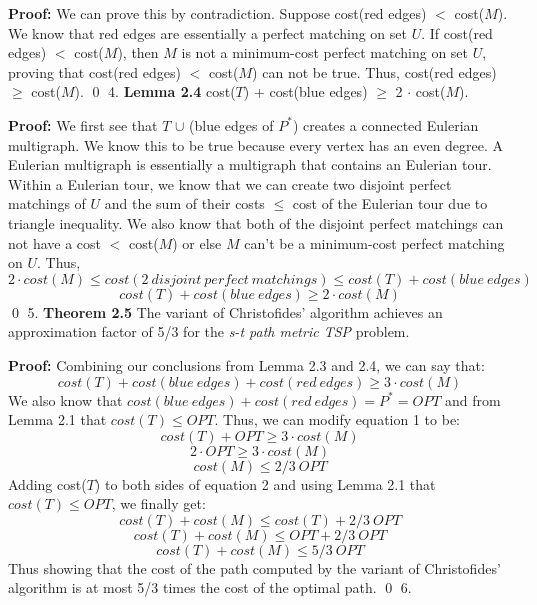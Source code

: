 \documentclass[oneside]{homework} %
\begin{document}
\textbf{Proof:} We can prove this by contradiction. Suppose cost(red edges) $<$ cost($M$). We know that red edges are essentially a perfect matching on set $U$. If cost(red edges) $<$ cost($M$), then $M$ is not a minimum-cost perfect matching on set $U$, proving that cost(red edges) $<$ cost($M$) can not be true. Thus, cost(red edges) $\geq$ cost($M$). \hfill\qed
\newline
\newline
{\large4.} \textbf{Lemma 2.4} cost($T$) + cost(blue edges) $\geq$ 2 $\cdot$ cost($M$).
\newline

\textbf{Proof:} We first see that $T$ $\cup$ (blue edges of $P^*$) creates a connected Eulerian multigraph. We know this to be true because every vertex has an even degree. A Eulerian multigraph is essentially a multigraph that contains an Eulerian tour. Within a Eulerian tour, we know that we can create two disjoint perfect matchings of $U$ and the sum of their costs $\leq$ cost of the Eulerian tour due to triangle inequality. We also know that both of the disjoint perfect matchings can not have a cost $<$ cost($M$) or else $M$ can't be a minimum-cost perfect matching on $U$. Thus, $$2 \cdot cost(M) \leq cost(2\ disjoint\ perfect\ matchings) \leq cost(T) + cost(blue\ edges)$$ $$cost(T) + cost(blue\ edges) \geq 2 \cdot cost(M)$$ \hfill\qed
\newline
\newline
{\large5.} \textbf{Theorem 2.5} The variant of Christofides' algorithm achieves an approximation factor of 5/3 for the \textit{s-t path metric TSP} problem.
\newline

\textbf{Proof:} Combining our conclusions from Lemma 2.3 and 2.4, we can say that: 
\begin{equation} \label{eq:1} 
cost(T) + cost(blue\ edges) + cost(red\ edges) \geq 3 \cdot cost(M)
\end{equation} 
We also know that $cost(blue\ edges) + cost(red\ edges) = P^* = OPT$ and from Lemma 2.1 that $cost(T) \leq OPT$. Thus, we can modify equation 1 to be: $$cost(T) + OPT \geq 3 \cdot cost(M)$$ $$2 \cdot OPT \geq 3 \cdot cost(M)$$
\begin{equation} \label{eq:2} 
cost(M) \leq 2/3\ OPT
\end{equation}
Adding cost($T$) to both sides of equation 2 and using Lemma 2.1 that $cost(T) \leq OPT$, we finally get: $$cost(T) + cost(M) \leq cost(T) + 2/3\ OPT$$ $$cost(T) + cost(M) \leq OPT + 2/3\ OPT$$ $$cost(T) + cost(M) \leq 5/3\ OPT$$
Thus showing that the cost of the path computed by the variant of Christofides' algorithm is at most 5/3 times the cost of the optimal path. \hfill\qed
\newpage
{\large6.}
\end{document}
